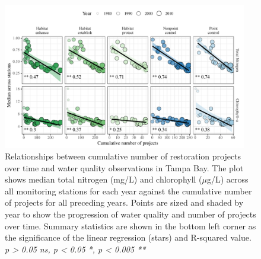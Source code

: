\documentclass[]{article}
\begin{document}
\begin{figure}
\centerline{\includegraphics[width = 0.95\textwidth]{figs/cumprj.pdf}}
\caption{Relationships between cumulative number of restoration projects over time and water quality observations in Tampa Bay. The plot shows median total nitrogen (mg/L) and chlorophyll ($\mu$g/L) across all monitoring stations for each year against the cumulative number of projects for all preceding years.  Points are sized and shaded by year to show the progression of water quality and number of projects over time.  Summary statistics are shown in the bottom left corner as the significance of the linear regression (stars) and R-squared value. \textit{p > 0.05 ns, p < 0.05 *, p < 0.005 **}}
\label{fig:cumprj}
\end{figure}

\clearpage
\end{document}
